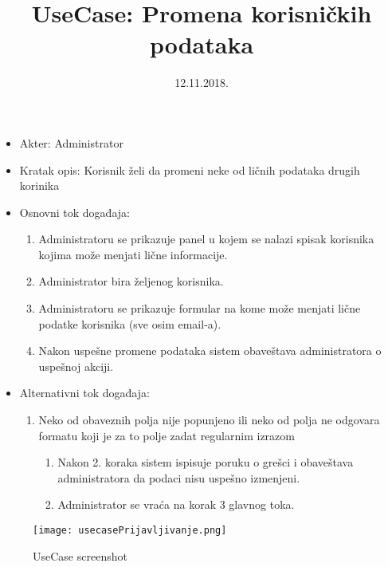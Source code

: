 \documentclass[a4paper]{article}
\title{UseCase: Promena korisničkih podataka}
\date{12.11.2018.}
\begin{document}
\maketitle

\begin{itemize}
    \item Akter: Administrator
    \item Kratak opis: Korisnik želi da promeni neke od ličnih podataka drugih korinika
    \item Osnovni tok događaja:
        \begin{enumerate}
            \item Administratoru se prikazuje panel u kojem se nalazi spisak korisnika kojima može menjati lične informacije.
            \item Administrator bira željenog korisnika.
            \item Administratoru se prikazuje formular na kome može menjati lične podatke korisnika (sve osim email-a).
            \item Nakon uspešne promene podataka sistem obaveštava administratora o uspešnoj akciji.
        \end{enumerate}
    \item Alternativni tok događaja:
        \begin{enumerate}
            \item Neko od obaveznih polja nije popunjeno ili neko od polja ne odgovara formatu koji je za to polje zadat regularnim izrazom
                \begin{enumerate}
                    \item Nakon 2. koraka sistem ispisuje poruku o grešci i obaveštava administratora da podaci nisu uspešno izmenjeni.
                    \item Administrator se vraća na korak 3 glavnog toka.
                \end{enumerate}
        \end{enumerate}
\end{itemize}

\begin{figure}
    \centering
    \texttt{[image: usecasePrijavljivanje.png]}
    \caption{UseCase screenshot}
    \label{fig:my_label}
\end{figure}
\end{document}
